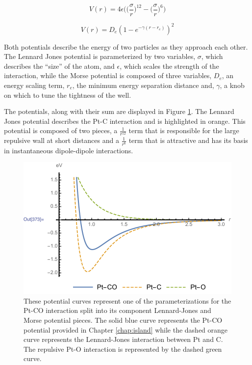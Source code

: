 \begin{equation}
V(r) = 4\epsilon\bigg(\bigg(\frac{\sigma}{r}\bigg)^{12} - \bigg(\frac{\sigma}{r}\bigg)^6\bigg)
\label{eq:lj}
\end{equation}

\begin{equation}
V(r) = D_e(1-e^{-\gamma(r-r_e)})^2
\label{eq:mp}
\end{equation}


Both potentials describe the energy of two particles as they approach each
other. The Lennard Jones potential is parameterized by two variables, $\sigma$,
which describes the ``size'' of the atom, and $\epsilon$, which scales the
strength of the interaction, while the Morse potential is composed of three
variables, $D_e$, an energy scaling term, $r_e$, the minimum energy separation
distance and, $\gamma$, a knob on which to tune the tightness of the well.

The potentials, along with their sum are displayed in Figure
\ref{fig:potentials}. The Lennard Jones potential describes the Pt-C
interaction and is highlighted in orange. This potential is composed of two
pieces, a $\frac{1}{r^{12}}$ term that is responsible for the large repulsive
wall at short distances and a $\frac{1}{r^{6}}$ term that is attractive and has
its basis in instantaneous dipole-dipole interactions.


\begin{figure}
\centering
\includegraphics[width=\linewidth]{../figures/chap1/bindingEnergy.pdf}
\caption{These potential curves represent one of the parameterizations for the Pt-CO
interaction split into its component Lennard-Jones and Morse potential pieces.
The solid blue curve represents the Pt-CO potential provided in Chapter
\ref{chap:island} while the dashed orange curve represents the
Lennard-Jones interaction between Pt and C. The repulsive Pt-O interaction is
represented by the dashed green curve.}
\label{fig:potentials}
\end{figure}

